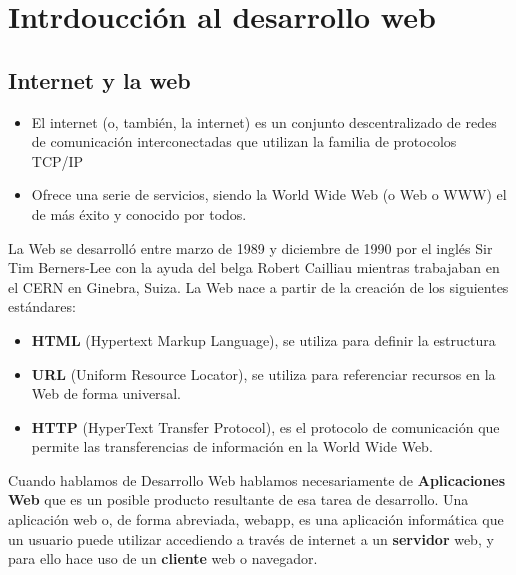 \section{Intrdoucción al desarrollo web}

\subsection{Internet y la web}
\begin{itemize}
    \item El internet (o, también, la internet) es un conjunto descentralizado
     de redes de comunicación interconectadas que utilizan la familia de 
     protocolos TCP/IP
    \item Ofrece una serie de servicios, siendo la World Wide Web 
    (o Web o WWW) el de más éxito y conocido por todos.
\end{itemize}

La Web se desarrolló entre marzo de 1989 y diciembre de 1990 por el inglés Sir Tim Berners-Lee
con la ayuda del belga Robert Cailliau mientras trabajaban en el CERN en Ginebra, 
Suiza. La Web nace a partir de la creación de los siguientes estándares:

\begin{itemize}
    \item \textbf{HTML} (Hypertext Markup Language), se utiliza para definir la estructura
    \item \textbf{URL}  (Uniform Resource Locator), se utiliza para referenciar recursos en la Web de forma universal.
    \item \textbf{HTTP} (HyperText Transfer Protocol), es el protocolo de comunicación que permite las transferencias de información en la World Wide Web.
\end{itemize}

Cuando hablamos de Desarrollo Web hablamos necesariamente de \textbf{Aplicaciones Web} que
es un posible producto resultante de esa tarea de desarrollo. Una aplicación web o, de forma abreviada, webapp, es una aplicación informática que un
usuario puede utilizar accediendo a través de internet a un \textbf{servidor} web, y para ello hace
uso de un \textbf{cliente} web o navegador.


